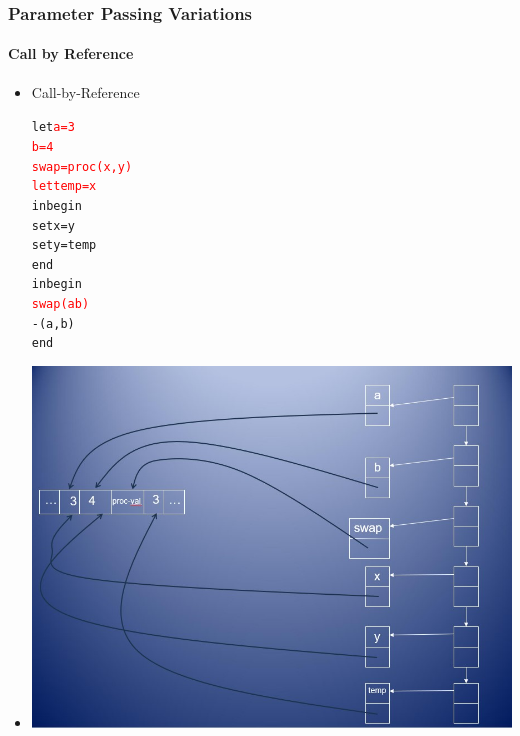 \documentclass{beamer}
\begin{document}
\begin{frame}[fragile]
\frametitle{Parameter Passing Variations}
\framesubtitle{Call by Reference}
\begin{scriptsize}
\begin{itemize}
\item<1-> Call-by-Reference
\begin{alltt}
\begin{tiny}
let \textcolor{red}{a = 3
    b = 4
    swap = proc (x, y)
	        let temp = x}
	        in begin
	             set x = y
	             set y = temp
	           end
in begin
     \textcolor{red}{swap(a b)}
     -(a, b)
   end
\end{tiny}
\end{alltt}

\item<1->
\begin{center}
\includegraphics[scale=0.35]{cbv-cbr6.jpg}
\end{center}

\end{itemize}
\end{scriptsize}
\end{frame}
\end{document}
